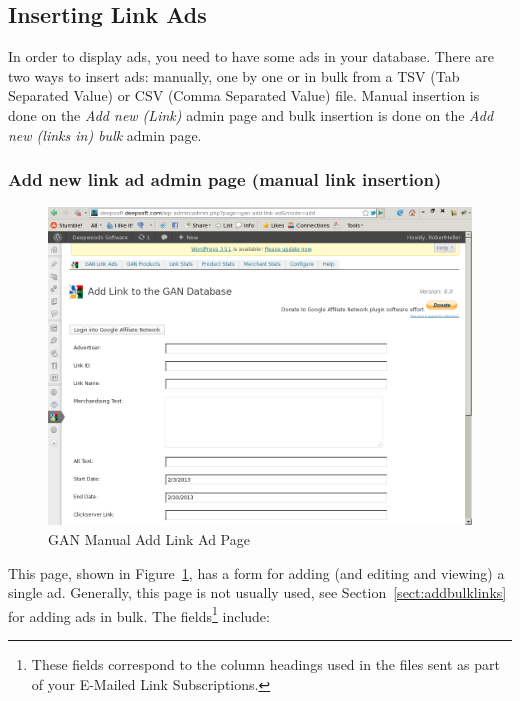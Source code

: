 \documentclass[letterpaper]{article}
\begin{document}
\subsection{Inserting Link Ads}

In order to display ads, you need to have some ads in your database.
There are two ways to insert ads: manually, one by one or in bulk from
a TSV (Tab Separated Value) or CSV (Comma Separated Value) file. Manual
insertion is done on the \emph{Add new (Link)} admin page and bulk insertion
is done on the \emph{Add new (links in) bulk} admin page.

\subsubsection{Add new link ad admin page (manual link insertion)}

\begin{figure}[ht]
\begin{centering}
\includegraphics[width=4.5in]{ganaddlinkad.png}
\caption{GAN Manual Add Link Ad Page}
\label{fig:ganaddlinkad}
\end{centering}
\end{figure}
This page, shown in Figure~\ref{fig:ganaddlinkad}, has a form for adding
(and editing and viewing) a single ad. Generally, this page is not
usually used, see Section~\ref{sect:addbulklinks} for adding ads in bulk.
The fields\footnote{These fields correspond to the column headings used
in the files sent as part of your E-Mailed Link Subscriptions.}
include: 
\end{document}
